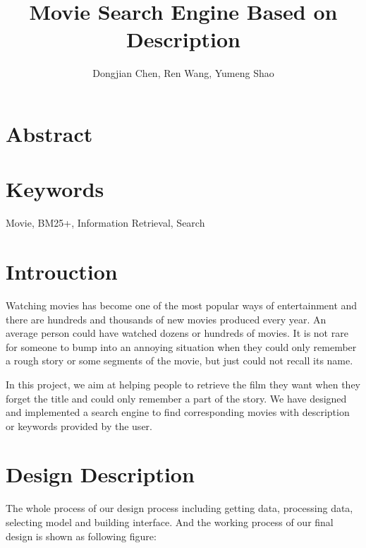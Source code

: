 \documentclass[letterpaper,10pt]{article}
\title{Movie Search Engine Based on Description}
\author{Dongjian Chen, Ren Wang, Yumeng Shao}
\begin{document}
\maketitle



\begin{multicols}{2}
    \section*{Abstract}

    \section*{Keywords}

    Movie, BM25+, Information Retrieval, Search

    \vfill\null
    \columnbreak


    \section{Introuction}

    Watching movies has become one of the most popular ways of entertainment and there are hundreds and thousands of new movies produced every year.
    An average person could have watched dozens or hundreds of movies.
    It is not rare for someone to bump into an annoying situation when they could only remember a rough story or some segments of the movie, but just could not recall its name.

    In this project, we aim at helping people to retrieve the film they want when they forget the title and could only remember a part of the story.
    We have designed and implemented a search engine to find corresponding movies with description or keywords provided by the user.


    \section{Design Description}

	The whole process of our design process including getting data, processing data, selecting model and building interface. And the working process of our final design is shown as following figure:
	

\end{multicols}
\end{document}
